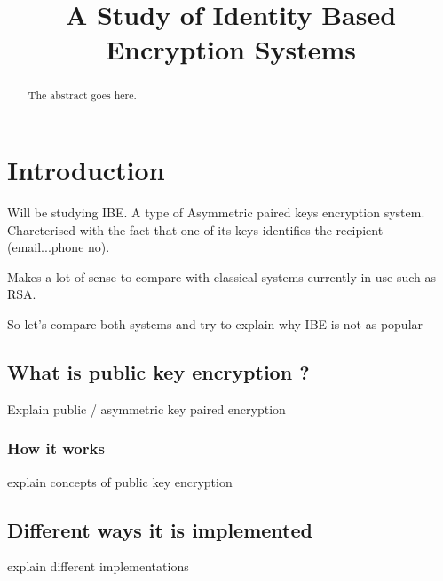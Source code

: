 \documentclass[conference]{IEEEtran}
\begin{document}
%
\title{A Study of Identity Based Encryption Systems}

\author{
}

\maketitle

\begin{abstract}
The abstract goes here.
\end{abstract}

\section{Introduction}
Will be studying IBE. A type of Asymmetric paired keys 
encryption system. Charcterised with the fact that one of its
keys identifies the recipient (email...phone no).

Makes a lot of sense to compare with classical 
systems currently in use such as RSA.

So let's compare both systems and try to explain why IBE is not as popular



\subsection{What is public key encryption ?}
Explain public / asymmetric key paired encryption

\subsubsection{How it works}
explain concepts of public key encryption

\subsection{Different ways it is implemented}
explain different implementations
\end{document}
